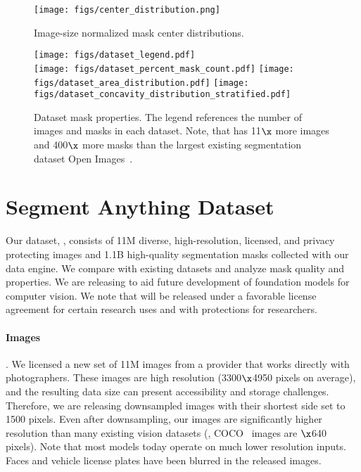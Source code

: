 \begin{figure}[t]\centering
\texttt{[image: figs/center\_distribution.png]}\vspace{-3mm}
\caption{Image-size normalized mask center distributions.}
\label{fig:analysis:center_distribution}\vspace{-2mm}
\end{figure}

\begin{figure*}[t]\centering\vspace{-1mm}
\texttt{[image: figs/dataset\_legend.pdf]}\\[-2mm]
\texttt{[image: figs/dataset\_percent\_mask\_count.pdf]}
\texttt{[image: figs/dataset\_area\_distribution.pdf]}
\texttt{[image: figs/dataset\_concavity\_distribution\_stratified.pdf]}
\vspace{-3mm}
\caption{Dataset mask properties. The legend references the number of images and masks in each dataset. Note, that \sad has 11$\x$ more images and 400$\x$ more masks than the largest existing segmentation dataset Open Images~\cite{OpenImages}.}
\label{fig:analysis}\vspace{-3mm}
\end{figure*}

\section{Segment Anything Dataset}\label{sec:dataset}

Our dataset, \sad, consists of 11M diverse, high-resolution, licensed, and privacy protecting images and 1.1B high-quality segmentation masks collected with our data engine. We compare \sad with existing datasets and analyze mask quality and properties. We are releasing \sad to aid future development of foundation models for computer vision. We note that \sad will be released under a favorable license agreement for certain research uses and with protections for researchers.

\paragraph{Images}. We licensed a new set of 11M images from a provider that works directly with photographers. These images are high resolution (3300$\x$4950 pixels on average), and the resulting data size can present accessibility and storage challenges. Therefore, we are releasing downsampled images with their shortest side set to 1500 pixels. Even after downsampling, our images are significantly higher resolution than many existing vision datasets (\eg, COCO~\cite{Lin2014} images are $\x$640 pixels). Note that most models today operate on much lower resolution inputs. Faces and vehicle license plates have been blurred in the released images.


